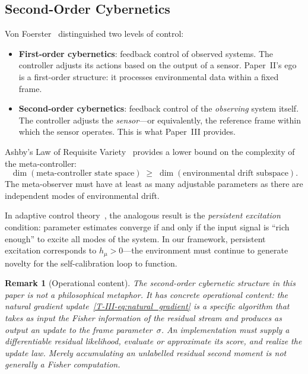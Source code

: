 \documentclass[12pt,a4paper,openany]{book}
\newtheorem{remark}[theorem]{Remark}
\begin{document}
\subsection{Second-Order Cybernetics}
\label{T-III-subsec:cybernetics}

Von Foerster~\cite{vonFoerster2003} distinguished two levels
of control:
\begin{itemize}
\item \textbf{First-order cybernetics}: feedback control of
  observed systems.
  The controller adjusts its actions based on the output of
  a sensor.
  Paper~II's ego is a first-order structure: it processes
  environmental data within a fixed frame.
\item \textbf{Second-order cybernetics}: feedback control of
  the \emph{observing} system itself.
  The controller adjusts the \emph{sensor}---or equivalently,
  the reference frame within which the sensor operates.
  This is what Paper~III provides.
\end{itemize}

Ashby's Law of Requisite Variety~\cite{Ashby1956} provides a
lower bound on the complexity of the meta-controller:
\begin{equation}
\label{T-III-eq:requisite_variety}
\dim\!\left(\text{meta-controller state space}\right)
\;\geq\; \dim\!\left(\text{environmental drift subspace}\right).
\end{equation}
The meta-observer must have at least as many adjustable
parameters as there are independent modes of environmental
drift.

In adaptive control
theory~\cite{AstromWittenmark1995}, the analogous result is
the \emph{persistent excitation} condition: parameter
estimates converge if and only if the input signal is
``rich enough'' to excite all modes of the system.
In our framework, persistent excitation corresponds to
$h_\mu > 0$---the environment must continue to generate
novelty for the self-calibration loop to function.

\begin{remark}[Operational content]
\label{T-III-rem:cybernetics_operational}
The second-order cybernetic structure in this paper is
\emph{not} a philosophical metaphor.
It has concrete operational content: the natural gradient
update~\eqref{T-III-eq:natural_gradient} is a specific algorithm
that takes as input the Fisher information of the residual
stream and produces as output an update to the frame
parameter~$\sigma$.
An implementation must supply a differentiable residual likelihood,
evaluate or approximate its score, and realize the update law.  Merely
accumulating an unlabelled residual second moment is not generally a
Fisher computation.
\end{remark}
\end{document}

